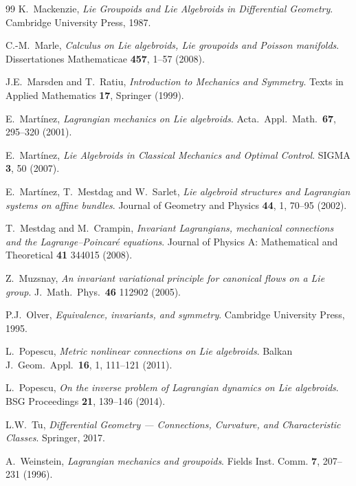 \documentclass[11pt]{article}
\theoremstyle{plain}
\theoremstyle{definition}
\begin{document}
\begin{thebibliography}{99}
 K.\ Mackenzie, {\em Lie Groupoids and Lie Algebroids in Differential Geometry}. Cambridge University Press, 1987.

 C.-M.\ Marle, {\em Calculus on Lie algebroids, Lie groupoids and Poisson manifolds}. Dissertationes Mathematicae \textbf{457}, 1--57 (2008).

 J.E.\ Marsden and T.\ Ratiu, {\em Introduction to Mechanics and Symmetry}. Texts in Applied Mathematics \textbf{17}, Springer (1999).

 E.\ Mart{\'i}nez, {\em Lagrangian mechanics on Lie algebroids}. Acta.\ Appl.\ Math.\ \textbf{67}, 295--320 (2001).

 E.\ Mart{\'i}nez, {\em 
Lie Algebroids in Classical Mechanics and Optimal Control}. SIGMA \textbf{3}, 50 (2007).

 E.\ Mart{\'i}nez, T.\ Mestdag and W.\ Sarlet, {\em Lie algebroid structures and Lagrangian systems on affine bundles}. Journal of Geometry and Physics \textbf{44}, 1, 70--95 (2002).



 T.\ Mestdag and M.\ Crampin, {\em Invariant Lagrangians, mechanical connections and the Lagrange--Poincar{\'e} equations}. Journal of Physics A: Mathematical and Theoretical \textbf{41} 344015 (2008).


 Z.\ Muzsnay, {\em An invariant variational principle for canonical flows on a Lie group}. J.\ Math.\ Phys.\ \textbf{46}  112902 (2005).

 P.J.\ Olver, {\em Equivalence, invariants, and symmetry}. Cambridge University Press, 1995.

 L.\ Popescu, {\em Metric nonlinear connections on Lie algebroids}. Balkan J.\ Geom.\ Appl.\ \textbf{16}, 1, 111--121 (2011).

 L.\ Popescu, {\em On the inverse problem of Lagrangian dynamics on Lie algebroids}. BSG Proceedings \textbf{21}, 139--146 (2014). 

 L.W.\ Tu, {\em Differential Geometry --- Connections, Curvature, and Characteristic Classes}. Springer, 2017.

 A.\ Weinstein, {\em Lagrangian mechanics and groupoids}. Fields Inst. Comm. \textbf{7}, 207--231 (1996).

\end{thebibliography}
 
\end{document}
